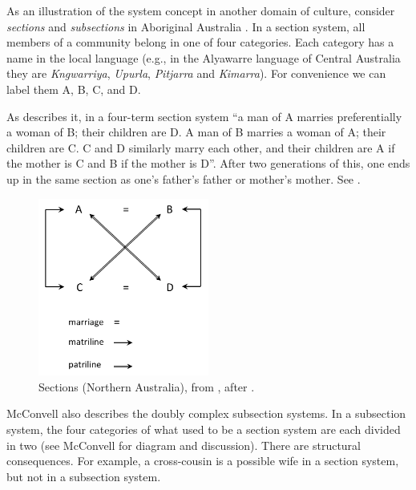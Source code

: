 \newpage
As an illustration of the system concept in another domain of culture, consider \textit{sections} 
and \textit{subsections} in Aboriginal Australia \citep{radcliffe-brown_social_1931}. In a 
section system, all members of a community belong in one of four 
categories. Each category has a name in the local language (e.g., in the 
Alyawarre language of Central Australia they are \textit{Kngwarriya}, 
\textit{Upurla}, \textit{Pitjarra} and \textit{Kimarra}). For convenience we can label them A, B, C, and D. 



As \citet[2]{mcconvell_origin_1985} describes it, in a four-term section system ``a man 
of A marries preferentially a woman of B; their children are D. A man of 
B marries a woman of A; their children are C. C and D similarly marry 
each other, and their children are A if the mother is C and B if the 
mother is D''. After two generations of this, one ends up in the same 
section as one's father's father or mother's mother. See .

\begin{figure}[h]
\includegraphics[width=0.5\textwidth,keepaspectratio]{figures/Fig05}
\caption{Sections (Northern Australia), from \citet[32]{mcconvell_origin_1985}, after 
\citet{radcliffe-brown_social_1931}. }
\label{sections}
\end{figure}







McConvell also describes the doubly complex subsection systems. In a subsection system, the four categories of what used to be a section system are each divided in 
two (see McConvell for diagram and discussion). There are structural 
consequences. For example, a cross-cousin is a possible wife in a 
section system, but not in a subsection system. 



